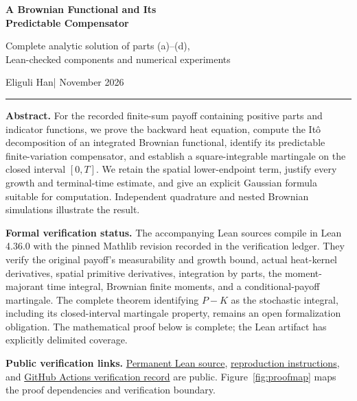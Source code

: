 \documentclass[11pt,letterpaper]{article}
\begin{document}
\begin{center}
{\LARGE\bfseries\color{Ink} A Brownian Functional and Its\\[3pt] Predictable Compensator}\par
\vspace{5pt}
{\large Complete analytic solution of parts (a)--(d),\\Lean-checked components and numerical experiments}\par
\vspace{6pt} Eliguli Han\quad | November 2026
\end{center}
\vspace{3pt}\hrule\vspace{6pt}

\textbf{Abstract.}
For the recorded finite-sum payoff containing positive parts and indicator functions, we prove the backward heat equation, compute the It\^o decomposition of an integrated Brownian functional, identify its predictable finite-variation compensator, and establish a square-integrable martingale on the closed interval $[0,T]$. We retain the spatial lower-endpoint term, justify every growth and terminal-time estimate, and give an explicit Gaussian formula suitable for computation. Independent quadrature and nested Brownian simulations illustrate the result.

\textbf{Formal verification status.}
The accompanying Lean sources compile in Lean 4.36.0 with the pinned Mathlib revision recorded in the verification ledger. They verify the original payoff's measurability and growth bound, actual heat-kernel derivatives, spatial primitive derivatives, integration by parts, the moment-majorant time integral, Brownian finite moments, and a conditional-payoff martingale. The complete theorem identifying $P-K$ as the stochastic integral, including its closed-interval martingale property, remains an open formalization obligation. The mathematical proof below is complete; the Lean artifact has explicitly delimited coverage.

\textbf{Public verification links.}
\href{https://github.com/Eliguli712/brownian_motion/blob/73a1d2ff4f3125264fe3d2e9d1daa013fd31582e/compensator/Brownian_Compensator_Verified_Components.lean}{Permanent Lean source},
\href{https://github.com/Eliguli712/brownian_motion/blob/73a1d2ff4f3125264fe3d2e9d1daa013fd31582e/compensator/README.md}{reproduction instructions}, and
\href{https://github.com/Eliguli712/brownian_motion/actions/runs/45158953034}{GitHub Actions verification record}
are public. Figure~\ref{fig:proofmap} maps the proof dependencies and verification boundary.
\end{document}
